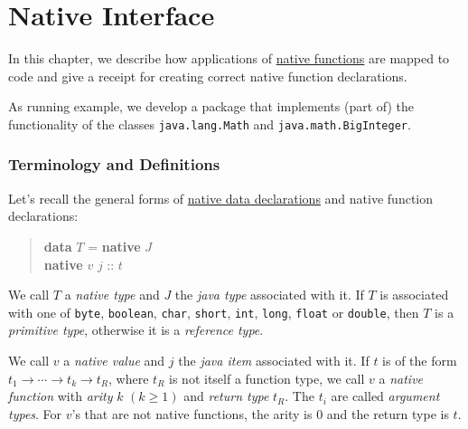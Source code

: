 %
%
%
%
%
%
%
%
%
%
%

\chapter{Native Interface} \label{native interface}

In this chapter, we describe how applications of \hyperref[nativefun]{native functions} are mapped to \java{} code and give a receipt for creating correct native function declarations.

As running example, we develop a package that implements (part of) the functionality of the \java{} classes \texttt{java.lang.Math} and \texttt{java.math.BigInteger}.

\subsection*{Terminology and Definitions}

Let's recall the general forms of \hyperref[nativedat]{native data declarations} and native function declarations:
\begin{quote}
\begin{flushleft}
\textbf{data} $T$ = \textbf{native} $J$\\
\textbf{native} $v$ $j$ :: $t$
\end{flushleft}
\end{quote}

We call $T$ a \emph{native type} and $J$ the \emph{java type} associated with it. If $T$ is associated with one of \texttt{byte}, \texttt{boolean}, \texttt{char}, \texttt{short}, \texttt{int}, \texttt{long}, \texttt{float} or \texttt{double}, then $T$ is a \emph{primitive type}, otherwise it is a  \emph{reference type}.

We call $v$ a \emph{native value} and $j$ the \emph{java item} associated with it. If $t$ is of the form $t_1 \rightarrow{} \cdots{} \rightarrow{} t_k \rightarrow{}t_R$, where $t_R$ is not itself a function type, we call $v$ a \emph{native function} with \emph{arity} $k$ $(k\ge 1)$ and \emph{return type} $t_R$. The $t_i$ are called \emph{argument types}. For $v$'s that are not native functions, the arity is 0 and the return type is $t$.

